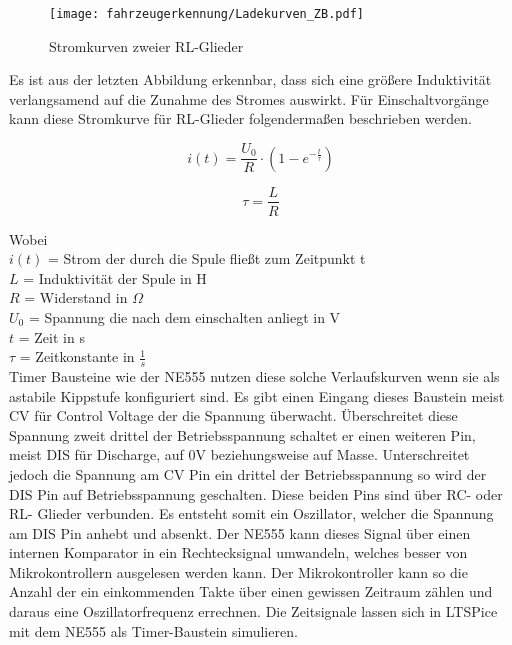 \begin{figure}[H]
    \centering
    \texttt{[image: fahrzeugerkennung/Ladekurven\_ZB.pdf]}
    \caption{Stromkurven zweier RL-Glieder}
\end{figure}

Es ist aus der letzten Abbildung erkennbar, dass sich eine größere Induktivität verlangsamend auf die Zunahme des Stromes auswirkt. Für Einschaltvorgänge kann diese Stromkurve
für RL-Glieder folgendermaßen beschrieben werden.

\begin{equation} \label{eq:i_L}
    i(t) = \frac{U_{0}}{R} \cdot (1 - e^{-\frac{t}{\tau}})
\end{equation}

\begin{equation} \label{eq:tau_RL}
    \tau = \frac{L}{R}
\end{equation} 

Wobei \\
$i(t)$ = Strom der durch die Spule fließt zum Zeitpunkt t \\
$L$ = Induktivität der Spule in H\\
$R$ = Widerstand in $\Omega$ \\
$U_0$ = Spannung die nach dem einschalten anliegt in V\\
$t$ = Zeit in s \\
$\tau$ = Zeitkonstante in $\frac{1}{s}$\\

Timer Bausteine wie der NE555 nutzen diese solche Verlaufskurven wenn sie als astabile Kippstufe konfiguriert sind.
Es gibt einen Eingang dieses Baustein meist CV für Control Voltage der die Spannung überwacht. Überschreitet diese Spannung zweit drittel
der Betriebsspannung schaltet er einen weiteren Pin, meist DIS für Discharge, auf 0V beziehungsweise auf Masse. Unterschreitet jedoch 
die Spannung am CV Pin ein drittel der Betriebsspannung so wird der DIS Pin auf Betriebsspannung geschalten. Diese beiden Pins 
sind über RC- oder RL- Glieder verbunden. Es entsteht somit ein Oszillator, welcher die Spannung am DIS Pin anhebt und absenkt.
Der NE555 kann dieses Signal über einen internen Komparator in ein Rechtecksignal umwandeln, welches besser von Mikrokontrollern ausgelesen
werden kann. Der Mikrokontroller kann so die Anzahl der ein einkommenden Takte über einen gewissen Zeitraum zählen und daraus eine Oszillatorfrequenz errechnen.
Die Zeitsignale lassen sich in LTSPice mit dem NE555 als Timer-Baustein simulieren.

